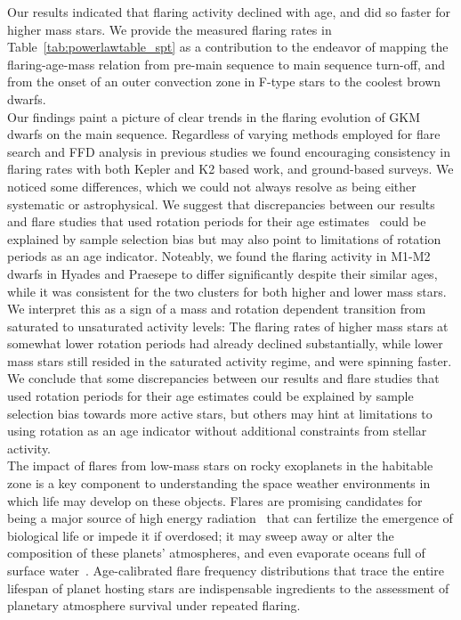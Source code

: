 \documentclass{aa}
\begin{document}
Our results indicated that flaring activity declined with age, and did so faster for higher mass stars. We provide the measured flaring rates in Table~\ref{tab:powerlawtable_spt} as a contribution to the endeavor of mapping the flaring-age-mass relation from pre-main sequence to main sequence turn-off, and from the onset of an outer convection zone in F-type stars to the coolest brown dwarfs.
\\
Our findings paint a picture of clear trends in the flaring evolution of GKM dwarfs on the main sequence. Regardless of varying methods employed for flare search and FFD analysis in previous studies we found encouraging consistency in flaring rates with both Kepler and K2 based work, and ground-based surveys. We noticed some differences, which we could not always resolve as being either systematic or astrophysical. We suggest that discrepancies between our results and flare studies that used rotation periods for their age estimates~\citep{davenport2019, raetz2020} could be explained by sample selection bias but may also point to limitations of rotation periods as an age indicator. Noteably, we found the flaring activity in M1-M2 dwarfs in Hyades and Praesepe to differ significantly despite their similar ages, while it was consistent for the two clusters for both higher and lower mass stars. We interpret this as a sign of a mass and rotation dependent transition from saturated to unsaturated activity levels: The flaring rates of higher mass stars at somewhat lower rotation periods had already declined substantially, while lower mass stars still resided in the saturated activity regime, and were spinning faster. We conclude that some discrepancies between our results and flare studies that used rotation periods for their age estimates could be explained by sample selection bias towards more active stars, but others may hint at limitations to using rotation as an age indicator without additional constraints from stellar activity. 
\\
The impact of flares from low-mass stars on rocky exoplanets in the habitable zone is a key component to understanding the space weather environments in which life may develop on these objects. Flares are promising candidates for being a major source of high energy radiation~\citep{airapetian2020} that can fertilize the emergence of biological life or impede it if overdosed; it may sweep away or alter the composition of these planets' atmospheres, and even evaporate oceans full of surface water~\citep{shields2016, tilley2019}. Age-calibrated flare frequency distributions that trace the entire lifespan of planet hosting stars are indispensable ingredients to the assessment of planetary atmosphere survival under repeated flaring. 
\end{document}
